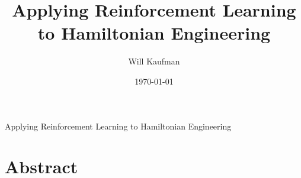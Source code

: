 \documentclass[
11pt,
english,
]{dcthesis}
\title{Applying Reinforcement Learning to Hamiltonian Engineering}
\author{Will Kaufman}
\date{\today}
\theoremstyle{definition}
\theoremstyle{remark}
\begin{document}
\begin{center}
\vspace*{\fill}

\huge
Applying Reinforcement Learning to Hamiltonian Engineering

\vspace*{\fill}
\end{center}

\normalsize
\newpage\null\thispagestyle{empty}\newpage

\frontmatter

\maketitle


\chapter*{Abstract}






\tableofcontents

\setcounter{tocdepth}{3}
\mainmatter






\backmatter




\end{document}
